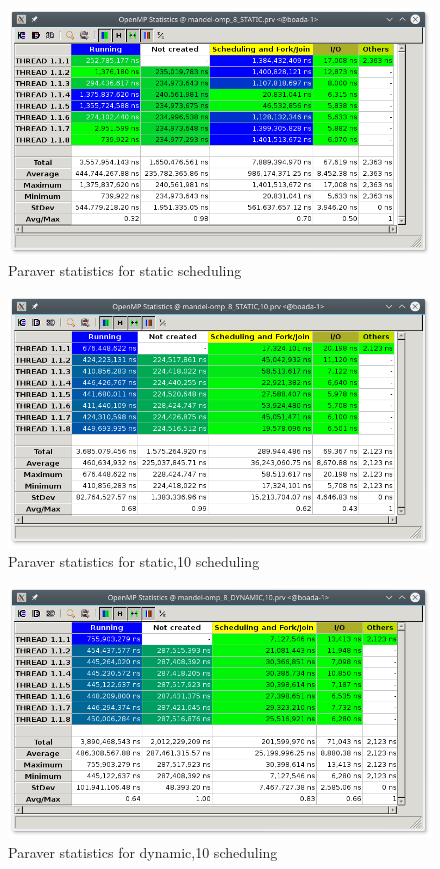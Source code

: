 \documentclass[11pt]{article}
\begin{document}
\begin{figure}[!htb]
  \centerline{\includegraphics[width=0.9\linewidth]{./For/Paraver/static.png}}
  \caption{Paraver statistics for static scheduling}
\end{figure}
\begin{figure}[!htb]
  \centerline{\includegraphics[width=0.9\linewidth]{./For/Paraver/static10.png}}
    \caption{Paraver statistics for static,10 scheduling}
\end{figure}
\begin{figure}[!htb]
  \centerline{\includegraphics[width=0.9\linewidth]{./For/Paraver/dynamic.png}}
    \caption{Paraver statistics for dynamic,10 scheduling}
\end{figure}
\end{document}
